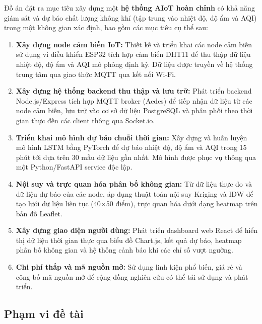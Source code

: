 Đồ án đặt ra mục tiêu xây dựng một \textbf{hệ thống AIoT hoàn chỉnh}
có khả năng giám sát và dự báo chất lượng không khí (tập trung vào
nhiệt độ, độ ẩm và AQI) trong một không gian xác định, bao gồm các mục tiêu
cụ thể sau:

\begin{enumerate}[leftmargin=2cm]
  \item \textbf{Xây dựng node cảm biến IoT:} Thiết kế và triển khai các
    node cảm biến sử dụng vi điều khiển ESP32 tích hợp cảm biến DHT11
    để thu thập dữ liệu nhiệt độ, độ ẩm và AQI mô phỏng định kỳ. Dữ liệu được truyền
    về hệ thống trung tâm qua giao thức MQTT qua kết nối Wi-Fi.

  \item \textbf{Xây dựng hệ thống backend thu thập và lưu trữ:} Phát
    triển backend Node.js/Express tích hợp MQTT broker (Aedes) để tiếp
    nhận dữ liệu từ các node cảm biến, lưu trữ vào cơ sở dữ liệu
    PostgreSQL và phân phối theo thời gian thực đến các client thông qua
    Socket.io.

  \item \textbf{Triển khai mô hình dự báo chuỗi thời gian:} Xây dựng
    và huấn luyện mô hình LSTM bằng PyTorch để dự báo nhiệt độ, độ
    ẩm và AQI trong 15 phút tới dựa trên 30 mẫu dữ liệu gần nhất. Mô hình
    được phục vụ thông qua một Python/FastAPI service độc lập.

  \item \textbf{Nội suy và trực quan hóa phân bố không gian:} Từ dữ
    liệu thực đo và dữ liệu dự báo của các node, áp dụng thuật toán nội
    suy Kriging và IDW để tạo lưới dữ liệu liên tục (40$\times$50 điểm),
    trực quan hóa dưới dạng heatmap trên bản đồ Leaflet.

  \item \textbf{Xây dựng giao diện người dùng:} Phát triển dashboard web
    React để hiển thị dữ liệu thời gian thực qua biểu đồ Chart.js, kết
    quả dự báo, heatmap phân bố không gian và hệ thống cảnh báo khi các
    chỉ số vượt ngưỡng.

  \item \textbf{Chi phí thấp và mã nguồn mở:} Sử dụng linh kiện phổ
    biến, giá rẻ và công bố mã nguồn mở để cộng đồng nghiên cứu có thể
    tái sử dụng và phát triển.
\end{enumerate}

\subsection{Phạm vi đề tài}
\label{subsec:intro:limitation}

